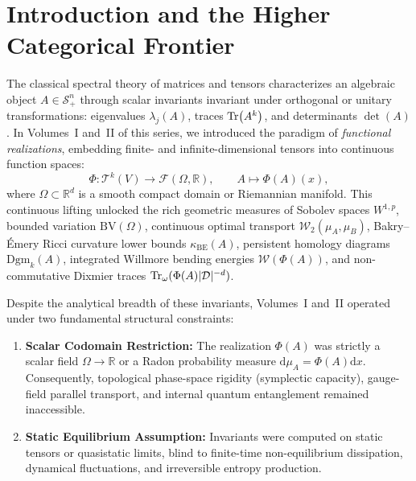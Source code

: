 \documentclass[11pt,a4paper,reqno]{amsart}
\theoremstyle{definition}
\theoremstyle{remark}
\numberwithin{equation}{section}
\newcommand{\dif}{\mathrm{d}}
\begin{document}
\maketitle
\tableofcontents

\section{Introduction and the Higher Categorical Frontier}
\label{sec:intro}

The classical spectral theory of matrices and tensors characterizes an algebraic object $A \in \mathcal{S}_+^n$ through scalar invariants invariant under orthogonal or unitary transformations: eigenvalues $\lambda_j(A)$, traces $\Tr(A^k)$, and determinants $\det(A)$. In Volumes~I and~II of this series, we introduced the paradigm of \emph{functional realizations}, embedding finite- and infinite-dimensional tensors into continuous function spaces:
\begin{equation}
\Phi \colon \mathcal{T}^k(V) \longrightarrow \mathcal{F}(\Omega, \mathbb{R}), \qquad A \longmapsto \Phi(A)(x),
\end{equation}
where $\Omega \subset \mathbb{R}^d$ is a smooth compact domain or Riemannian manifold. This continuous lifting unlocked the rich geometric measures of Sobolev spaces $W^{1,p}$, bounded variation $\mathrm{BV}(\Omega)$, continuous optimal transport $\mathcal{W}_2(\mu_A, \mu_B)$, Bakry--Émery Ricci curvature lower bounds $\kappa_{\mathrm{BE}}(A)$, persistent homology diagrams $\mathrm{Dgm}_k(A)$, integrated Willmore bending energies $\mathcal{W}(\Phi(A))$, and non-commutative Dixmier traces $\Tr_\omega(\Phi(A) |\mathcal{D}|^{-d})$.

Despite the analytical breadth of these invariants, Volumes~I and~II operated under two fundamental structural constraints:
\begin{enumerate}
    \item \textbf{Scalar Codomain Restriction:} The realization $\Phi(A)$ was strictly a scalar field $\Omega \to \mathbb{R}$ or a Radon probability measure $\dif\mu_A = \Phi(A) \dif x$. Consequently, topological phase-space rigidity (symplectic capacity), gauge-field parallel transport, and internal quantum entanglement remained inaccessible.
    \item \textbf{Static Equilibrium Assumption:} Invariants were computed on static tensors or quasistatic limits, blind to finite-time non-equilibrium dissipation, dynamical fluctuations, and irreversible entropy production.
\end{enumerate}
\end{document}
